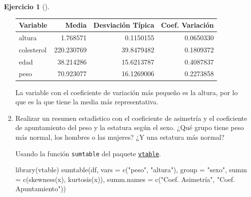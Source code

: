 \documentclass[
  a4paper,
]{scrreport}
\newenvironment{Shaded}{\begin{snugshade}}{\end{snugshade}}
\newcommand{\AttributeTok}[1]{\textcolor[rgb]{0.40,0.45,0.13}{#1}}
\newcommand{\FunctionTok}[1]{\textcolor[rgb]{0.28,0.35,0.67}{#1}}
\newcommand{\NormalTok}[1]{\textcolor[rgb]{0.00,0.23,0.31}{#1}}
\newcommand{\StringTok}[1]{\textcolor[rgb]{0.13,0.47,0.30}{#1}}
\theoremstyle{definition}
\newtheorem{exercise}{Ejercicio}[chapter]
\theoremstyle{remark}
\begin{document}
\begin{exercise}[]
\begin{enumerate}
\begin{tcolorbox}
  \begin{table}
  \centering
  \begin{tabular}{l|r|r|r}
  \hline
  Variable & Media & Desviación Típica & Coef. Variación\\
  \hline
  altura & 1.768571 & 0.1150155 & 0.0650330\\
  \hline
  colesterol & 220.230769 & 39.8479482 & 0.1809372\\
  \hline
  edad & 38.214286 & 15.6213787 & 0.4087837\\
  \hline
  peso & 70.923077 & 16.1269006 & 0.2273858\\
  \hline
  \end{tabular}
  \end{table}

  La variable con el coeficiente de variación más pequeño es la altura,
  por lo que es la que tiene la media más representativa.

  \end{tcolorbox}
\item
  Realizar un resumen estadístico con el coeficiente de asimetría y el
  coeficiente de apuntamiento del peso y la estatura según el sexo. ¿Qué
  grupo tiene peso más normal, los hombres o las mujeres? ¿Y una
  estatura más normal?

  \begin{tcolorbox}[enhanced jigsaw, toprule=.15mm, rightrule=.15mm, arc=.35mm, colback=white, colbacktitle=quarto-callout-tip-color!10!white, toptitle=1mm, left=2mm, colframe=quarto-callout-tip-color-frame, opacityback=0, breakable, opacitybacktitle=0.6, bottomtitle=1mm, titlerule=0mm, title=\textcolor{quarto-callout-tip-color}{\faLightbulb}\hspace{0.5em}{Solución 1}, bottomrule=.15mm, coltitle=black, leftrule=.75mm]

  Usando la función \texttt{sumtable} del paquete
  \href{https://cran.r-project.org/web/packages/vtable/vignettes/sumtable.html}{\texttt{vtable}}.

\begin{Shaded}
\begin{Highlighting}[]
\FunctionTok{library}\NormalTok{(vtable)}
\FunctionTok{sumtable}\NormalTok{(df, }\AttributeTok{vars =} \FunctionTok{c}\NormalTok{(}\StringTok{"peso"}\NormalTok{, }\StringTok{"altura"}\NormalTok{), }\AttributeTok{group =} \StringTok{"sexo"}\NormalTok{, }\AttributeTok{summ =} \FunctionTok{c}\NormalTok{(}\StringTok{\textquotesingle{}skewness(x)\textquotesingle{}}\NormalTok{, }\StringTok{\textquotesingle{}kurtosis(x)\textquotesingle{}}\NormalTok{),}
\AttributeTok{summ.names =} \FunctionTok{c}\NormalTok{(}\StringTok{"Coef. Asimetría"}\NormalTok{, }\StringTok{"Coef. Apuntamiento"}\NormalTok{))}
\end{Highlighting}
\end{Shaded}


\end{tcolorbox}
\end{enumerate}
\end{exercise}
\end{document}
